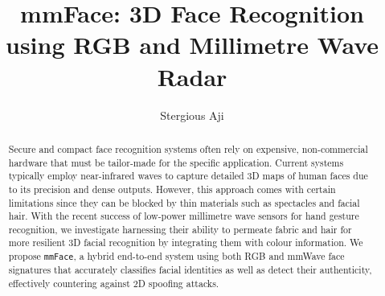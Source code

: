 \documentclass{mpaper}
\begin{document}
\title{mmFace: 3D Face Recognition using RGB and Millimetre Wave Radar}
\author{Stergious Aji}

\maketitle

\begin{abstract}
    Secure and compact face recognition systems often rely on expensive, non-commercial hardware that must be tailor-made for the specific application. Current systems typically employ near-infrared waves to capture detailed 3D maps of human faces due to its precision and dense outputs. However, this approach comes with certain limitations since they can be blocked by thin materials such as spectacles and facial hair. With the recent success of low-power millimetre wave sensors for hand gesture recognition, we investigate harnessing their ability to permeate fabric and hair for more resilient 3D facial recognition by integrating them with colour information. We propose \texttt{mmFace}, a hybrid end-to-end system using both RGB and mmWave face signatures that accurately classifies facial identities as well as detect their authenticity, effectively countering against 2D spoofing attacks.
\end{abstract}
\vspace{-0.1cm}

\end{document}
